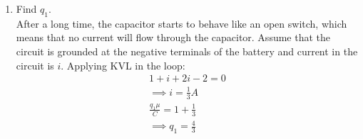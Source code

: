 \documentclass[journal,12pt,twocolumn]{IEEEtran}
\renewcommand\thesection{\arabic{section}}
\begin{document}
\begin{enumerate}[label=\arabic*.,ref=\thesection.\theenumi]
\item Find $q_1$.\\
\solution After a long time, the capacitor starts to behave like an open switch, which means that no current will flow through the capacitor. Assume that the circuit is grounded at the negative terminals of the battery and current in the circuit is $i$. Applying KVL in the loop:
\begin{align}
    1+i+2i-2=0\\
    \implies i=\frac{1}{3}A\\
    \frac{q_1\mu}{C} = 1+\frac{1}{3}\\
    \implies q_1=\frac{4}{3}
\end{align}


\end{enumerate}
\end{document}
